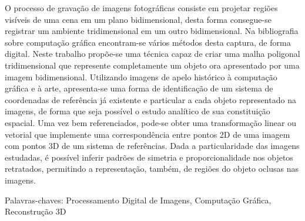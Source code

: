 	O processo de gravação de imagens fotográficas consiste em projetar regiões visíveis de uma cena em um plano bidimensional, desta forma consegue-se registrar um ambiente tridimensional em um outro bidimensional. Na bibliografia sobre computação gráfica encontram-se vários métodos desta captura, de forma digital. Neste trabalho propõe-se uma técnica capaz de criar uma malha poligonal tridimensional que represente completamente um objeto ora apresentado por uma imagem bidimensional. Utilizando imagens de apelo histórico à computação gráfica e à arte, apresenta-se uma forma de identificação de um sistema de coordenadas de referência já existente e particular a cada objeto representado na imagens, de forma que seja possível o estudo analítico de sua constituição espacial. Uma vez bem referenciados, pode-se obter uma transformação linear ou vetorial que implemente uma correspondência entre pontos 2D de uma imagem com pontos 3D de um sistema de referências. Dada a particularidade das imagens estudadas, é possível inferir padrões de simetria e proporcionalidade nos objetos retratados, permitindo a representação, também, de regiões do objeto oclusas nas imagens.

\noindent Palavras-chaves: Processamento Digital de Imagens, Computação Gráfica, Reconstrução 3D